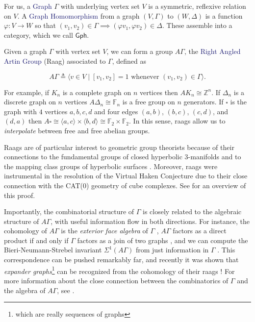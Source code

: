 \documentclass[12pt]{article}
\theoremstyle{definition}
\theoremstyle{theorem}
\newcommand{\teq}{\triangleq}
\newcommand*{\important}[1]{\textcolor{MidnightBlue}{#1}}
\begin{document}
  For us, a \important{Graph} $\Gamma$ with underlying vertex set $V$ is a 
  symmetric, reflexive relation on $V$. A \important{Graph Homomorphism} from 
  a graph $(V,\Gamma)$ to $(W,\Delta)$ is a 
  function $\varphi : V \to W$ so that $(v_1, v_2) \in \Gamma \implies (\varphi v_1, \varphi v_2) \in \Delta$.
  These assemble into a category, which we call $\mathsf{Gph}$.

  Given a graph $\Gamma$ with vertex set $V$, we can form a group $A\Gamma$, the 
  \important{Right Angled Artin Group} (Raag) associated to $\Gamma$, defined as

  \[ A\Gamma \teq \langle v \in V \mid [v_1, v_2] = 1 \text{ whenever } (v_1,v_2) \in \Gamma \rangle .\]

  For example, if $K_n$ is a complete graph on $n$ vertices then 
  $AK_n \cong \mathbb{Z}^n$. If $\Delta_n$ is a discrete graph on $n$ vertices
  $A\Delta_n \cong \mathbb{F}_n$ is a free group on $n$ generators. 
  If $\square$ is the graph with $4$ vertices $a,b,c,d$ and 
  four edges $(a,b)$, $(b,c)$, $(c,d)$, and $(d,a)$ then $A \square \cong 
  \langle a, c \rangle \times \langle b, d \rangle \cong \mathbb{F}_2 \times \mathbb{F}_2$.
  In this sense, raags allow us to \emph{interpolate} between free and free
  abelian groups. 

  Raags are of particular interest to geometric group theorists because
  of their connections to the fundamental groups of closed hyperbolic
  $3$-manifolds \cite{servatiusSurfaceSubgroupsGraph1989} 
  and to the mapping class groups of hyperbolic surfaces 
  \cite{kimGeometryCurveGraph2014}. Moreover, raags were instrumental in
  the resolution of the Virtual Haken Conjecture due to their close connection 
  with the CAT(0) geometry of cube complexes. 
  See \cite{bestvinaGeometricGroupTheory2013} for an overview of this proof.

  Importantly, the combinatorial structure of $\Gamma$ is closely related to the 
  algebraic structure of $A \Gamma$, with useful information flow in both directions. 
  For instance, the cohomology of $A \Gamma$ is the \emph{exterior face algebra} 
  of $\Gamma$ \cite{sabalkaRigidityIsomorphismProblem2009},
  $A\Gamma$ factors as a direct product if and only if $\Gamma$ factors
  as a join of two graphs \cite{servatiusAutomorphismsGraphGroups1989},
  and we can compute the Bieri-Neumann-Strebel invariant $\Sigma^1(A\Gamma)$
  from just information in $\Gamma$ \cite{meierBieriNeumannStrebelInvariantsGraph1995}.
  This correspondence can be pushed remarkably far, and recently it was
  shown that \emph{expander graphs}\footnote{which are really sequences of graphs}
  can be recognized from the cohomology of their raags
  \cite{floresExpandersRightangledArtin2021}! For more information about the 
  close connection between the combinatorics of $\Gamma$ and the algebra of
  $A\Gamma$, see 
  \cite{floresExpandersRightangledArtin2021, koberdaGeometryCombinatoricsRightAngled2022}.
  
\end{document}
